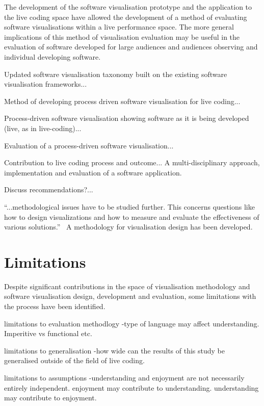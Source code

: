 The development of the software visualisation prototype and the application to the live coding space have allowed the development of a method of evaluating software visualisations within a live performance space. The more general implications of this method of visualisation evaluation may be useful in the evaluation of software developed for large audiences and audiences observing and individual developing software.


Updated software visualisation taxonomy built on the existing software visualisation frameworks...

Method of developing process driven software visualisation for live coding...

Process-driven software visualisation showing software as it is being developed (live, as in live-coding)...

Evaluation of a process-driven software visualisation...

Contribution to live coding process and outcome... A multi-disciplinary approach, implementation and evaluation of a software application.

Discuss recommendations?...

``...methodological issues have to be studied further. This concerns questions like how to design visualizations and how to measure and evaluate the effectiveness of various solutions.''~\cite{VanWijk2005} A methodology for visualisation design has been developed.


\section{Limitations}

Despite significant contributions in the space of visualisation methodology and software visualisation design, development and evaluation, some limitations with the process have been identified.

limitations to evaluation methodlogy
-type of language may affect understanding. Imperitive vs functional etc.

limitations to generalisation
-how wide can the results of this study be generalised outside of the field of live coding.

limitations to assumptions
-understanding and enjoyment are not necessarily entirely independent. enjoyment may contribute to understanding. understanding may contribute to enjoyment.

